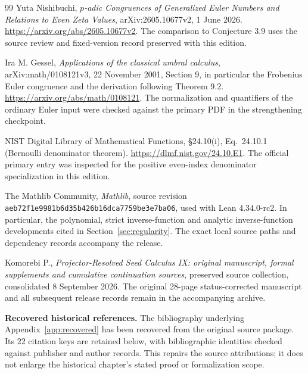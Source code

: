 \documentclass[11pt]{article}
\theoremstyle{definition}
\theoremstyle{remark}
\numberwithin{equation}{section}
\begin{document}
\clearpage
\appendix





\clearpage\def\IXMainAtlas{1}\def\AtlasFigDir{../../figures/worked}\clearpage
\begin{thebibliography}{99}
Yuta Nishibuchi,
\emph{$p$-adic Congruences of Generalized Euler Numbers and Relations to Even
Zeta Values}, arXiv:2605.10677v2, 1 June 2026.
\url{https://arxiv.org/abs/2605.10677v2}.
The comparison to Conjecture 3.9 uses the source review and fixed-version
record preserved with this edition.

Ira M. Gessel, \emph{Applications of the classical umbral calculus},
arXiv:math/0108121v3, 22 November 2001, Section 9, in particular the Frobenius Euler congruence and the derivation following Theorem 9.2.
\url{https://arxiv.org/abs/math/0108121}.
The normalization and quantifiers of the ordinary Euler input were checked against the primary PDF in the strengthening checkpoint.

NIST Digital Library of Mathematical Functions, \S24.10(i),
Eq.\ 24.10.1 (Bernoulli denominator theorem).
\url{https://dlmf.nist.gov/24.10.E1}. The official primary entry was inspected
for the positive even-index denominator specialization in this edition.

The Mathlib Community,
\emph{Mathlib}, source revision
\nolinkurl{aeb72f1e9981b6d35b426b16dca7759be3e7ba06},
used with Lean 4.34.0-rc2.
In particular, the polynomial, strict inverse-function and analytic
inverse-function developments cited in Section~\ref{sec:regularity}.
The exact local source paths and dependency records accompany the release.

Komorebi P.,
\emph{Projector-Resolved Seed Calculus IX: original manuscript, formal
supplements and cumulative continuation sources}, preserved source collection,
consolidated 8 September 2026.
The original 28-page status-corrected manuscript and all subsequent release
records remain in the accompanying archive.

\medskip\noindent\textbf{Recovered historical references.}
The bibliography underlying Appendix~\ref{app:recovered} has been recovered
from the original source package. Its 22 citation keys are retained below,
with bibliographic identities checked against publisher and author records.
This repairs the source attributions; it does not enlarge the historical
chapter's stated proof or formalization scope.

\end{thebibliography}
\end{document}
